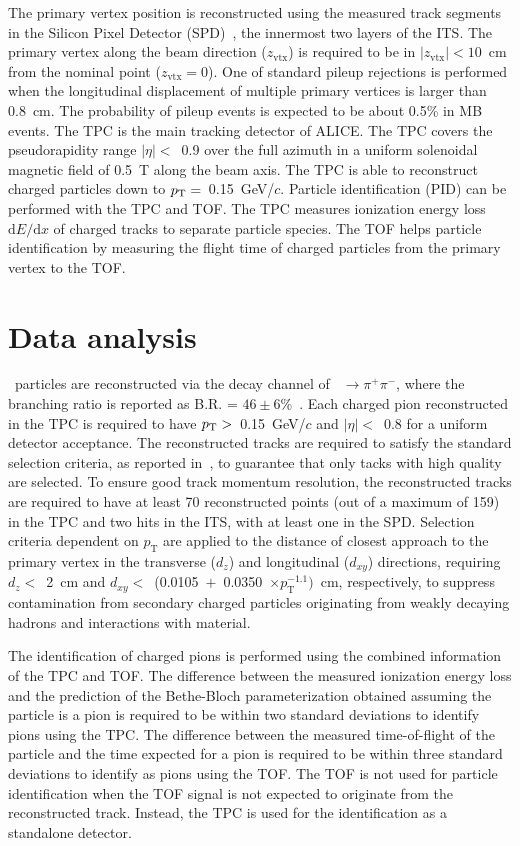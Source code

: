 The primary vertex position is reconstructed using the measured track segments in the Silicon Pixel Detector (SPD)~\cite{Santoro2009:ALICESPD}, the innermost two layers of the ITS. The primary vertex along the beam direction ($z_\mathrm{vtx}$) is required to be in $|z_\mathrm{vtx}|<10$~cm from the nominal point ($z_\mathrm{vtx}=0$). One of standard pileup rejections is performed when the longitudinal displacement of multiple primary vertices is larger than 0.8~cm. The probability of pileup events is expected to be about 0.5\% in MB events. The TPC is the main tracking detector of ALICE. The TPC covers the pseudorapidity range $|\eta|<$~0.9 over the full azimuth in a uniform solenoidal magnetic field of 0.5~T along the beam axis. The TPC is able to reconstruct charged particles down to $p_{\rm{T}}=$~0.15~GeV/$c$. Particle identification (PID) can be performed with the TPC and TOF. The TPC measures ionization energy loss $\mathrm{d}E/\mathrm{d}x$ of charged tracks to separate particle species. The TOF helps particle identification by measuring the flight time of charged particles from the primary vertex to the TOF.

\section{Data analysis}

\fzero~particles are reconstructed via the decay channel of \fzero~$\rightarrow \pi^{+}\pi^{-}$, where the branching ratio is reported as B.R. = $46\pm6$\%~\cite{Stone:2013eaa}. Each charged pion reconstructed in the TPC is required to have $p_{\rm{T}}>$~0.15~GeV/$c$ and $|\eta|<$~0.8 for a uniform detector acceptance. The reconstructed tracks are required to satisfy the standard selection criteria, as reported in~\cite{ALICE:2022qnb}, to guarantee that only tacks with high quality are selected. To ensure good track momentum resolution, the reconstructed tracks are required to have at least 70 reconstructed points (out of a maximum of 159) in the TPC and two hits in the ITS, with at least one in the SPD. Selection criteria dependent on $p_{\mathrm{T}}$ are applied to the distance of closest approach to the primary vertex in the transverse ($d_{z}$) and longitudinal ($d_{xy}$) directions, requiring $d_{z}<$~2~cm and $d_{xy}<$~(0.0105~$+$~0.0350~$\times p_{\mathrm{T}}^{-1.1})$~cm, respectively, to suppress contamination from secondary charged particles originating from weakly decaying hadrons and interactions with material.

The identification of charged pions is performed using the combined information of the TPC and TOF. The difference between the measured ionization energy loss and the prediction of the Bethe-Bloch parameterization obtained assuming the particle is a pion is required to be within two standard deviations to identify pions using the TPC. The difference between the measured time-of-flight of the particle and the time expected for a pion is required to be within three standard deviations to identify as pions using the TOF. The TOF is not used for particle identification when the TOF signal is not expected to originate from the reconstructed track. Instead, the TPC is used for the identification as a standalone detector.

